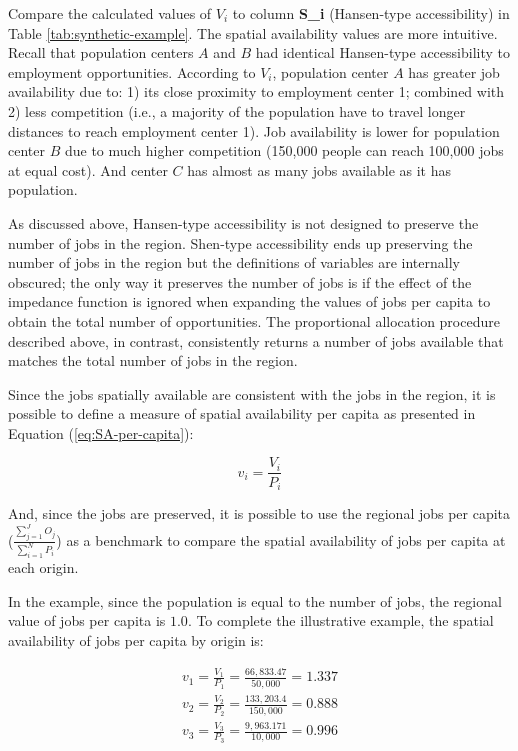 \documentclass[10pt,letterpaper]{article}
\begin{document}
Compare the calculated values of \(V_i\) to column \textbf{S\_i}
(Hansen-type accessibility) in Table \ref{tab:synthetic-example}. The
spatial availability values are more intuitive. Recall that population
centers \(A\) and \(B\) had identical Hansen-type accessibility to
employment opportunities. According to \(V_i\), population center \(A\)
has greater job availability due to: 1) its close proximity to
employment center 1; combined with 2) less competition (i.e., a majority
of the population have to travel longer distances to reach employment
center 1). Job availability is lower for population center \(B\) due to
much higher competition (150,000 people can reach 100,000 jobs at equal
cost). And center \(C\) has almost as many jobs available as it has
population.

As discussed above, Hansen-type accessibility is not designed to
preserve the number of jobs in the region. Shen-type accessibility ends
up preserving the number of jobs in the region but the definitions of
variables are internally obscured; the only way it preserves the number
of jobs is if the effect of the impedance function is ignored when
expanding the values of jobs per capita to obtain the total number of
opportunities. The proportional allocation procedure described above, in
contrast, consistently returns a number of jobs available that matches
the total number of jobs in the region.

Since the jobs spatially available are consistent with the jobs in the
region, it is possible to define a measure of spatial availability per
capita as presented in Equation (\ref{eq:SA-per-capita}):

\begin{equation}
\label{eq:SA-per-capita}
v_i = \frac{V_i}{P_i}
\end{equation}

And, since the jobs are preserved, it is possible to use the regional
jobs per capita (\(\frac{\sum_{j=1}^J O_j}{\sum_{i=1}^N P_i}\)) as a
benchmark to compare the spatial availability of jobs per capita at each
origin.

In the example, since the population is equal to the number of jobs, the
regional value of jobs per capita is \(1.0\). To complete the
illustrative example, the spatial availability of jobs per capita by
origin is:

\begin{equation}
\label{eq:SA-per-capita-2populations}
\begin{array}{l}
v_{1} = \frac{V_1}{P_1} =  \frac{66,833.47}{50,000} = 1.337\\
v_{2} =  \frac{V_{2}}{P_2} =  \frac{133,203.4}{150,000} = 0.888\\
v_{3} =  \frac{V_{3}}{P_3} =  \frac{9,963.171}{10,000} = 0.996\\
\end{array}
\end{equation}
\end{document}
